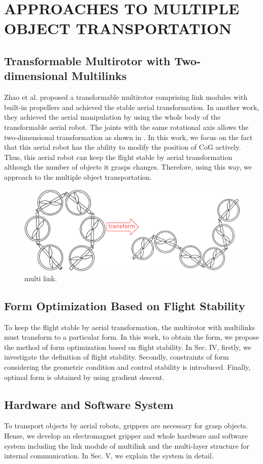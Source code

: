 \section{APPROACHES TO MULTIPLE OBJECT TRANSPORTATION}
\subsection{Transformable Multirotor with Two-dimensional Multilinks}
Zhao et al.\cite{Zhao2016} proposed a transformable multirotor comprising link modules with built-in propellers and achieved the stable aerial transformation. In another work\cite{ZhaoICRA2017}, they achieved the aerial manipulation by using the whole body of the transformable aerial robot. The joints with the same rotational axis allows the two-dimensional transformation as shown in . In this work, we focus on the fact that this aerial robot has the ability to modify the position of CoG actively. Thus, this aerial robot can keep the flight stable by aerial transformation although the number of objects it grasps changes. Therefore, using this way, we approach to the multiple object transportation.
\begin{figure}[t]
  \begin{center}
    \includegraphics[width=1.0\columnwidth]{figs/multi_link.pdf}
  \end{center}
  \caption{multi link.\label{figure:multi_link}}
\end{figure}
 
\subsection{Form Optimization Based on Flight Stability}
To keep the flight stable by aerial transformation, the multirotor with multilinks must transform to a particular form. In this work, to obtain the form, we propose the method of form optimization based on flight stability. In Sec. IV, firstly, we investigate the definition of flight stability. Secondly, constraints of form considering the geometric condition and control stability is introduced. Finally, optimal form is obtained by using gradient descent.
  
\subsection{Hardware and Software System}
To transport objects by aerial robots, grippers are necessary for grasp objects. Hense, we develop an electromagnet gripper and whole hardware and software system including the link module of multilink and the multi-layer structure for internal communication. In Sec. V, we explain the system in detail.
